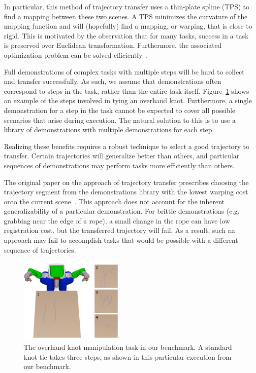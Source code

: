 \documentclass[conference]{IEEEtran}
\begin{document}
In particular, this method of trajectory transfer uses a thin-plate
spline (TPS) to find a mapping between these two scenes. A TPS
minimizes the curvature of the mapping function and will (hopefully)
find a mapping, or warping, that is close to rigid. This is motivated
by the observation that for many tasks, success in a task is preserved
over Euclidean transformation. Furthermore, the associated
optimization problem can be solved efficiently~\cite{Wahba_TPS1990}.

Full demonstrations of complex tasks with multiple steps will be hard
to collect and transfer successfully. As such, we assume that
demonstrations often correspond to steps in the task, rather than the
entire task itself. Figure~\ref{fig:knot_steps} shows an example of
the steps involved in tying an overhand knot. Furthermore, a single demonstration
for a step in the task cannot be expected to cover all possible
scenarios that arise during execution.  The natural solution to this
is to use a library of demonstrations with multiple demonstrations for
each step.

Realizing these benefits requires a robust technique to select a good
trajectory to transfer.  Certain trajectories will generalize better
than others, and particular sequences of demonstrations may perform
tasks more efficiently than others.

The original paper on the approach of trajectory transfer
prescribes choosing the trajectory segment from the demonstrations
library with the lowest warping cost onto the current
scene~\cite{Schulmanetal_ISRR2013}.  This approach does not account
for the inherent generalizability of a particular demonstration. For
brittle demonstrations (e.g. grabbing near the edge of a rope), a
small change in the rope can have low registration cost, but the
transferred trajectory will fail.  As a result, such an approach may
fail to accomplish tasks that would be possible with a different
sequence of trajectories.

\begin{figure}[t]
  \centering
    \noindent
    \includegraphics[width=0.45\textwidth]{figures/knot_steps_num.png}
  \caption{The overhand knot manipulation task in our benchmark.
           A standard knot tie takes three steps, as shown in this
           particular execution from our benchmark.}
  \label{fig:knot_steps}
\end{figure}
\end{document}
